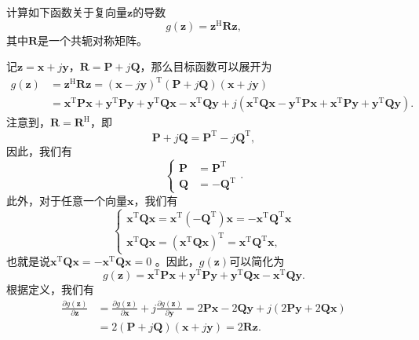 \begin{example}
    计算如下函数关于复向量\( \bm{z} \)的导数
    \[
        g(\bm{z}) = \bm{z}^{\mathrm{H}} \mathbf{R} \bm{z},
    \]
    其中\( \mathbf{R} \)是一个共轭对称矩阵。
\end{example}
\begin{solution}
    记\( \bm{z} = \bm{x} + j \bm{y} \)，\( \mathbf{R} = \mathbf{P} + j \mathbf{Q} \)，那么目标函数可以展开为
    \[
        \begin{split}
            g(\bm{z}) & = \bm{z}^{\mathrm{H}} \mathbf{R} \bm{z} = (\bm{x} - j \bm{y})^{\mathrm{T}}(\mathbf{P} + j \mathbf{Q})(\bm{x} + j \bm{y})                                                                                                                                                                                                                 \\
                      & = \bm{x}^{\mathrm{T}} \mathbf{P} \bm{x} + \bm{y}^{\mathrm{T}} \mathbf{P} \bm{y} + \bm{y}^{\mathrm{T}} \mathbf{Q} \mathbf{x} - \bm{x}^{\mathrm{T}} \mathbf{Q} \bm{y} + j (\bm{x}^{\mathrm{T}} \mathbf{Q} \bm{x} - \bm{y}^{\mathrm{T}} \mathbf{P} \bm{x} + \bm{x}^{\mathrm{T}} \mathbf{P} \bm{y} + \bm{y}^{\mathrm{T}} \mathbf{Q} \bm{y}).
        \end{split}
    \]
    注意到，\( \mathbf{R} = \mathbf{R}^{\mathrm{H}} \)，即
    \[
        \mathbf{P} + j \mathbf{Q} = \mathbf{P}^{\mathrm{T}} - j\mathbf{Q}^{\mathrm{T}},
    \]
    因此，我们有
    \[
        \begin{cases}
            \mathbf{P} & = \mathbf{P}^{\mathrm{T}}   \\
            \mathbf{Q} & = - \mathbf{Q}^{\mathrm{T}}
        \end{cases}.
    \]
    此外，对于任意一个向量\( \bm{x} \)，我们有
    \[
        \begin{cases}
            \bm{x}^{\mathrm{T}} \mathbf{Q} \bm{x} = \bm{x}^{\mathrm{T}} ( - \mathbf{Q}^{\mathrm{T}}) \bm{x} = - \bm{x}^{\mathrm{T}} \mathbf{Q}^{\mathrm{T}} \bm{x} \\
            \bm{x}^{\mathrm{T}} \mathbf{Q} \bm{x} = (\bm{x}^{\mathrm{T}} \mathbf{Q} \bm{x})^{\mathrm{T}} = \bm{x}^{\mathrm{T}} \mathbf{Q}^{\mathrm{T}} \bm{x},
        \end{cases}
    \]
    也就是说\( \bm{x}^{\mathrm{T}} \mathbf{Q} \bm{x} =  - \bm{x}^{\mathrm{T}} \mathbf{Q} \bm{x} = 0\) 。因此，\( g(\bm{z}) \)可以简化为
    \[
        g(\bm{z}) = \bm{x}^{\mathrm{T}} \mathbf{P} \bm{x} + \bm{y}^{\mathrm{T}} \mathbf{P} \bm{y} + \bm{y}^{\mathrm{T}} \mathbf{Q} \mathbf{x} - \bm{x}^{\mathrm{T}} \mathbf{Q} \bm{y}.
    \]
    根据定义，我们有
    \[
        \begin{split}
            \frac{\partial g(\bm{z})}{\partial \bm{z}} & = \frac{\partial g(\bm{z})}{\partial \bm{x}} + j \frac{\partial g(\bm{z})}{\partial \bm{y}} = 2\mathbf{P}\bm{x} - 2 \mathbf{Q} \bm{y} + j(2 \mathbf{P} \bm{y} + 2\mathbf{Q} \bm{x}) \\
                                                       & = 2(\mathbf{P} + j \mathbf{Q}) (\bm{x} + j \bm{y}) = 2\mathbf{R} \mathbf{z}.
        \end{split}
    \]
\end{solution}

